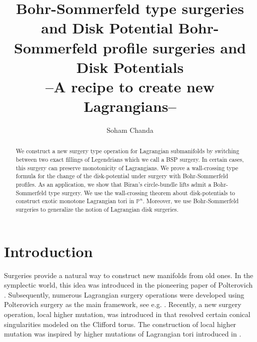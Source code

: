 \documentclass[11pt, oneside,dvipsnames]{amsart}
\title {Bohr-Sommerfeld type surgeries and Disk Potential}
\author{Soham Chanda}
\newcommand{\<}{\langle}
\renewcommand{\>}{\rangle}
\newcommand{\bP}{\mathbb{P}}
\theoremstyle{definition}
\theoremstyle{definition}
\numberwithin{equation}{subsection}
\begin{document}
\title[Bohr-Sommerfeld profile surgeries and Disk Potentials] { Bohr-Sommerfeld profile surgeries and Disk Potentials \\
 \vspace{0.5cm}  \bf{\footnotesize{--A recipe to create new Lagrangians--}}}


\maketitle
\begin{abstract}
We construct  a new surgery type operation for Lagrangian submanifolds by switching between two exact fillings of Legendrians which we call a BSP surgery. In certain cases, this surgery can preserve monotonicity of Lagrangians. We prove a wall-crossing type formula for the change of the disk-potential under surgery with Bohr-Sommerfeld profiles.  As an application, we show that Biran's circle-bundle lifts admit a Bohr-Sommerfeld type surgery.  We use the wall-crossing theorem about disk-potentials to construct exotic monotone Lagrangian tori in $\bP^n$. Moreover, we use Bohr-Sommerfeld surgeries to generalize the notion of Lagrangian disk surgeries.
\end{abstract}
\setcounter{tocdepth}{2}
\tableofcontents
\setlength{\parskip}{0.5em}





\pagebreak
\section{Introduction}

Surgeries provide a natural way to construct new manifolds from old ones. In the symplectic world, this idea was introduced in the pioneering paper of Polterovich \cite{pol:surg}. Subsequently, numerous Lagrangian surgery operations were developed using Polterovich surgery as the main framework, see e.g. \cite{yau17,haug,makwu}. Recently, a new surgery operation, local higher mutation, was introduced in \cite{Cha23} that resolved certain conical singularities modeled on the Clifford torus. The construction of local higher mutation was inspired by higher mutations of Lagrangian tori introduced in \cite{PT20}. 
\end{document}
